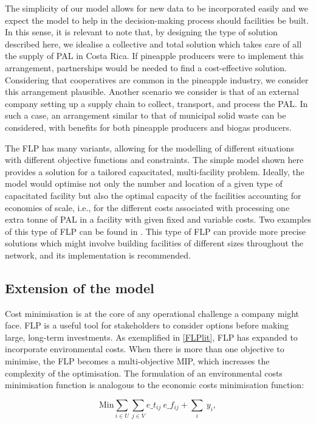 The simplicity of our model allows for new data to be incorporated easily and we expect the model to help in the decision-making process should facilities be built. In this sense, it is relevant to note that, by designing the type of solution described here, we idealise a collective and total solution which takes care of all the supply of PAL in Costa Rica. If pineapple producers were to implement this arrangement, partnerships would be needed to find a cost-effective solution. Considering that cooperatives are common in the pineapple industry, we consider this arrangement plausible. Another scenario we consider is that of an external company setting up a supply chain to collect, transport, and process the PAL. In such a case, an arrangement similar to that of municipal solid waste can be considered, with benefits for both pineapple producers and biogas producers.

The FLP has many variants, allowing for the modelling of different situations with different objective functions and constraints. The simple model shown here provides a solution for a tailored capacitated, multi-facility problem. Ideally, the model would optimise not only the number and location of a given type of capacitated facility but also the optimal capacity of the facilities accounting for economies of scale, i.e., for the different costs associated with processing one extra tonne of PAL in a facility with given fixed and variable costs. Two examples of this type of FLP can be found in \cite{wetterlund2012optimal, nordin2022optimal}. This type of FLP can provide more precise solutions which might involve building facilities of different sizes throughout the network, and its implementation is recommended.

\subsection{Extension of the model}

Cost minimisation is at the core of any operational challenge a company might face. FLP is a useful tool for stakeholders to consider options before making large, long-term investments. As exemplified in \cref{FLPlit}, FLP has expanded to incorporate environmental costs. When there is more than one objective to minimise, the FLP becomes a multi-objective MIP, which increases the complexity of the optimisation. The formulation of an environmental costs minimisation function is analogous to the economic costs minimisation function:

\begin{equation}
\label{envObjFun}
    \text{Min} \sum_{i \in U} \sum_{j \in V} e\_t_{ij} \ e\_f_{ij} + \sum _i \ y_i,
\end{equation} 

